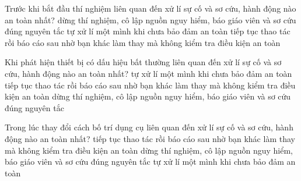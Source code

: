 



\begin{ex}
Trước khi bắt đầu thí nghiệm liên quan đến xử lí sự cố và sơ cứu, hành động nào an toàn nhất?
\choice
{\True dừng thí nghiệm, cô lập nguồn nguy hiểm, báo giáo viên và sơ cứu đúng nguyên tắc}
{tự xử lí một mình khi chưa bảo đảm an toàn}
{tiếp tục thao tác rồi báo cáo sau}
{nhờ bạn khác làm thay mà không kiểm tra điều kiện an toàn}
\end{ex}

\begin{ex}
Khi phát hiện thiết bị có dấu hiệu bất thường liên quan đến xử lí sự cố và sơ cứu, hành động nào an toàn nhất?
\choice
{tự xử lí một mình khi chưa bảo đảm an toàn}
{tiếp tục thao tác rồi báo cáo sau}
{nhờ bạn khác làm thay mà không kiểm tra điều kiện an toàn}
{\True dừng thí nghiệm, cô lập nguồn nguy hiểm, báo giáo viên và sơ cứu đúng nguyên tắc}
\end{ex}

\begin{ex}
Trong lúc thay đổi cách bố trí dụng cụ liên quan đến xử lí sự cố và sơ cứu, hành động nào an toàn nhất?
\choice
{tiếp tục thao tác rồi báo cáo sau}
{nhờ bạn khác làm thay mà không kiểm tra điều kiện an toàn}
{\True dừng thí nghiệm, cô lập nguồn nguy hiểm, báo giáo viên và sơ cứu đúng nguyên tắc}
{tự xử lí một mình khi chưa bảo đảm an toàn}
\end{ex}

